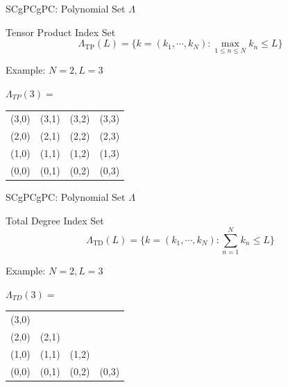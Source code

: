 \documentclass{beamer}
\begin{document}
\begin{frame}{SCgPC}{gPC: Polynomial Set $\Lambda$}%
  \vfill
  \centering
  \begin{exampleblock}{Tensor Product Index Set}
    \[\Lambda_\text{TP}(L)=\Big\{k=(k_1,\cdots,k_N): \max_{1\leq n\leq N}k_n\leq L \Big\}\]
  \end{exampleblock}
  \vfill
  Example: $N=2,L=3$
  \vfill
    \begin{table}\centering
      $\Lambda_{TP}(3)=$
      \begin{tabular}{|c c c c|} \hline
        (3,0) & (3,1) & (3,2) & (3,3) \\
        (2,0) & (2,1) & (2,2) & (2,3) \\
        (1,0) & (1,1) & (1,2) & (1,3) \\
        (0,0) & (0,1) & (0,2) & (0,3) \\ \hline
      \end{tabular}
    \end{table}
  \vfill
\end{frame}

\begin{frame}{SCgPC}{gPC: Polynomial Set $\Lambda$}%
  \vfill
  \centering
  \begin{exampleblock}{Total Degree Index Set}
    \[\Lambda_\text{TD}(L)=\Big\{k=(k_1,\cdots,k_N):\sum_{n=1}^N k_n \leq L \Big\}\]
  \end{exampleblock}
  \vfill
  Example: $N=2,L=3$
  \vfill
    \begin{table}\centering
      $\Lambda_{TD}(3)=$
      \begin{tabular}{|c c c c|} \hline
        (3,0) &       &       &       \\
        (2,0) & (2,1) &       &       \\
        (1,0) & (1,1) & (1,2) &       \\
        (0,0) & (0,1) & (0,2) & (0,3) \\ \hline
      \end{tabular}
    \end{table}
  \vfill
\end{frame}
\end{document}

